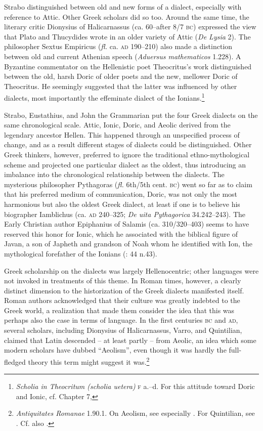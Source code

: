 Strabo distinguished between old and new forms of a dialect, especially with reference to Attic. Other Greek scholars did so too. Around the same time, the literary critic Dionysius of Halicarnassus (ca. 60–after 8/7 \textsc{bc}) expressed the view that Plato and Thucydides wrote in an older variety of Attic (\textit{De Lysia} 2). The philosopher Sextus Empiricus (\textit{fl.} ca. \textsc{ad} 190–210) also made a distinction between old and current Athenian speech (\textit{Aduersus mathematicos} 1.228). A Byzantine commentator on the Hellenistic poet Theocritus’s work distinguished between the old, harsh Doric of older poets and the new, mellower Doric of Theocritus. He seemingly suggested that the latter was influenced by other dialects, most importantly the effeminate dialect of the Ionians.\footnote{\textit{Scholia in Theocritum (scholia uetera)} \textsc{f} a.–d. For this attitude toward Doric and Ionic, cf. Chapter 7, }

Strabo, Eustathius, and John the Grammarian put the four Greek dialects on the same chronological scale. Attic, Ionic, Doric, and Aeolic derived from the legendary ancestor Hellen. This happened through an unspecified process of change, and as a result different stages of dialects could be distinguished. Other Greek thinkers, however, preferred to ignore the traditional ethno-mythological scheme and projected one particular dialect as the oldest, thus introducing an imbalance into the chronological relationship between the dialects. The mysterious philosopher Pythagoras (\textit{fl.} 6th/5th cent. \textsc{bc}) went so far as to claim that his preferred medium of communication, Doric, was not only the most harmonious but also the oldest Greek dialect, at least if one is to believe his biographer Iamblichus (ca. \textsc{ad} 240–325; \textit{De uita Pythagorica} 34.242–243). The Early Christian author Epiphanius of Salamis (ca. 310/320–403) seems to have reserved this honor for Ionic, which he associated with the biblical figure of Javan, a son of Japheth and grandson of Noah whom he identified with Ion, the mythological forefather of the Ionians (\citealt{VanRooy2013}: 44 n.43).

Greek scholarship on the dialects was largely Hellenocentric; other languages were not invoked in treatments of this theme. In Roman times, however, a clearly distinct dimension to the historization of the Greek dialects manifested itself. Roman authors acknowledged that their culture was greatly indebted to the Greek world, a realization that made them consider the idea that this was perhaps also the case in terms of language. In the first centuries \textsc{bc} and \textsc{ad}, several scholars, including Dionysius of Halicarnassus, Varro, and Quintilian, claimed that Latin descended – at least partly – from Aeolic, an idea which some modern scholars have dubbed “Aeolism”, even though it was hardly the full-fledged theory this term might suggest it was.\footnote{\textit{Antiquitates Romanae} 1.90.1. On Aeolism, see especially \citet[]{Stevens2006}. For Quintilian, see \citet[149]{Fogen2000}. Cf. also \citet[117--119]{Schopsdau1992}.}

